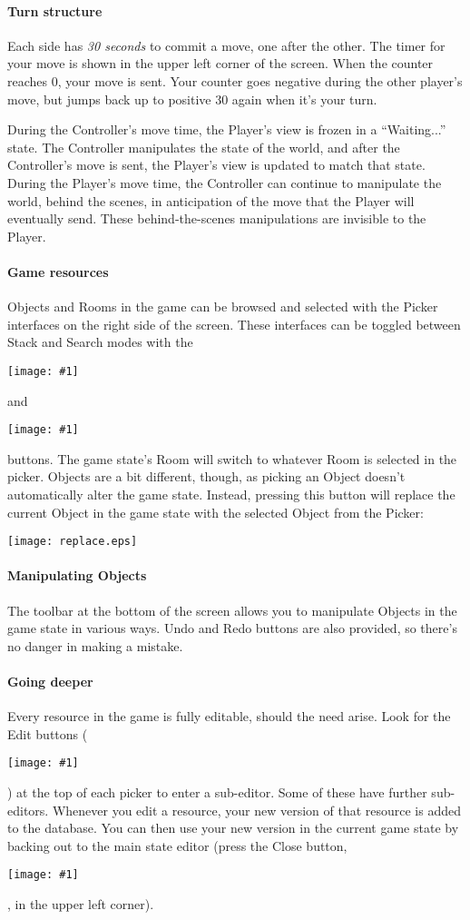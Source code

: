 \documentclass[12pt]{article}
\newcommand{\buttonFig}[1]{
\parbox[c]{1em}{\vspace{0em} \texttt{[image: \#1]} }
}
\begin{document}
\paragraph{Turn structure}  Each side has {\it 30 seconds} to commit a move, one after the other.  The timer for your move is shown in the upper left corner of the screen.  When the counter reaches 0, your move is sent.  Your counter goes negative during the other player's move, but jumps back up to positive 30 again when it's your turn.

During the Controller's move time, the Player's view is frozen in a ``Waiting...'' state.  The Controller manipulates the state of the world, and after the Controller's move is sent, the Player's view is updated to match that state.  During the Player's move time, the Controller can continue to manipulate the world, behind the scenes, in anticipation of the move that the Player will eventually send.  These behind-the-scenes manipulations are invisible to the Player.  %

\paragraph{Game resources}  Objects and Rooms in the game can be browsed and selected with the Picker interfaces on the right side of the screen.  These interfaces can be toggled between Stack and Search modes with the \buttonFig{stack.eps} and \buttonFig{search.eps} buttons.  The game state's Room will switch to whatever Room is selected in the picker.  Objects are a bit different, though, as picking an Object doesn't automatically alter the game state.  Instead, pressing this button will replace the current Object in the game state with the selected Object from the Picker:
\begin{center}
\texttt{[image: replace.eps]}
\end{center}

\paragraph{Manipulating Objects}  The toolbar at the bottom of the screen allows you to manipulate Objects in the game state in various ways.  Undo and Redo buttons are also provided, so there's no danger in making a mistake.

\paragraph{Going deeper} Every resource in the game is fully editable, should the need arise.  Look for the Edit buttons (\buttonFig{edit.eps}) at the top of each picker to enter a sub-editor.  Some of these have further sub-editors.  Whenever you edit a resource, your new version of that resource is added to the database.  You can then use your new version in the current game state by backing out to the main state editor (press the Close button, \buttonFig{close.eps}, in the upper left corner).
\end{document}
